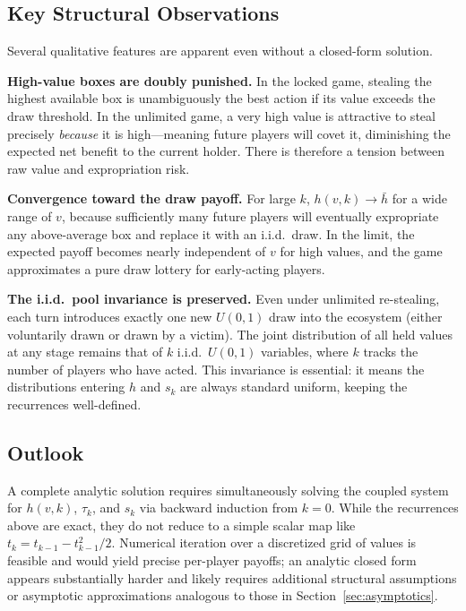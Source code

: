 \documentclass{article}
\begin{document}
\subsection{Key Structural Observations}

Several qualitative features are apparent even without a closed-form solution.

\textbf{High-value boxes are doubly punished.} In the locked game, stealing the highest available box is unambiguously the best action if its value exceeds the draw threshold. In the unlimited game, a very high value is attractive to steal precisely \emph{because} it is high—meaning future players will covet it, diminishing the expected net benefit to the current holder. There is therefore a tension between raw value and expropriation risk.

\textbf{Convergence toward the draw payoff.} For large $k$, $h(v, k) \to \bar{h}$ for a wide range of $v$, because sufficiently many future players will eventually expropriate any above-average box and replace it with an i.i.d.\ draw. In the limit, the expected payoff becomes nearly independent of $v$ for high values, and the game approximates a pure draw lottery for early-acting players.

\textbf{The i.i.d.\ pool invariance is preserved.} Even under unlimited re-stealing, each turn introduces exactly one new $U(0,1)$ draw into the ecosystem (either voluntarily drawn or drawn by a victim). The joint distribution of all held values at any stage remains that of $k$ i.i.d.\ $U(0,1)$ variables, where $k$ tracks the number of players who have acted. This invariance is essential: it means the distributions entering $h$ and $s_k$ are always standard uniform, keeping the recurrences well-defined.

\subsection{Outlook}

A complete analytic solution requires simultaneously solving the coupled system for $h(v, k)$, $\tau_k$, and $s_k$ via backward induction from $k=0$.
While the recurrences above are exact, they do not reduce to a simple scalar map like $t_k = t_{k-1} - t_{k-1}^2/2$.
Numerical iteration over a discretized grid of values is feasible and would yield precise per-player payoffs; an analytic closed form appears substantially harder and likely requires additional structural assumptions or asymptotic approximations analogous to those in Section~\ref{sec:asymptotics}.
\end{document}

